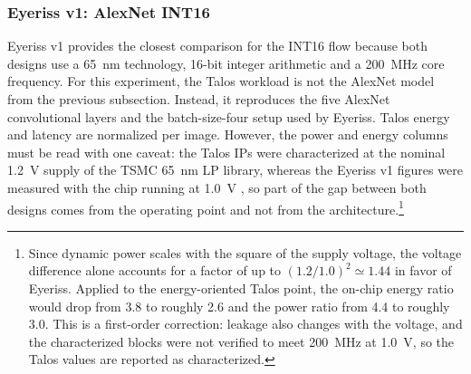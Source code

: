 \subsubsection{Eyeriss v1: AlexNet INT16}
Eyeriss v1 provides the closest comparison for the INT16 flow because
both designs use a 65~nm technology, 16-bit integer arithmetic and a
200~MHz core frequency. For this experiment, the Talos workload is not
the AlexNet model from the previous subsection. Instead, it
reproduces the five AlexNet convolutional layers and the batch-size-four
setup used by Eyeriss. Talos energy and latency are normalized per
image. However, the power and energy columns must be read with one
caveat: the Talos IPs were characterized at the nominal 1.2~V supply
of the TSMC 65~nm LP library, whereas the Eyeriss v1 figures were
measured with the chip running at 1.0~V \cite{chen2017eyeriss}, so
part of the gap between both designs comes from the operating point
and not from the architecture.\footnote{Since dynamic power scales
with the square of the supply voltage, the voltage difference alone
accounts for a factor of up to $(1.2/1.0)^2\simeq1.44$ in favor of
Eyeriss. Applied to the energy-oriented Talos point, the on-chip
energy ratio would drop from 3.8 to roughly 2.6 and the power ratio
from 4.4 to roughly 3.0. This is a first-order correction: leakage
also changes with the voltage, and the characterized blocks were not
verified to meet 200~MHz at 1.0~V, so the Talos values are reported as
characterized.}

